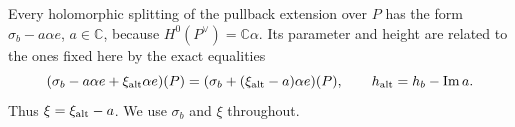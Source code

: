 \begin{remark}
\label{rem:V:splitting-change}
Every holomorphic splitting of the pullback extension over $P$
has the form $\sigma_b-a\alpha e$, $a\in\mathbb C$, because
$H^0(P^\vee)=\mathbb C\alpha$. Its parameter and height are
related to the ones fixed here by the exact equalities
\[
 (\sigma_b-a\alpha e+\xi_{\rm alt}\alpha e)(P)
  =(\sigma_b+(\xi_{\rm alt}-a)\alpha e)(P),
 \qquad h_{\rm alt}=h_b-\operatorname{Im}a.
\]
Thus $\xi=\xi_{\rm alt}-a$. We use $\sigma_b$ and $\xi$
throughout.
\end{remark}
